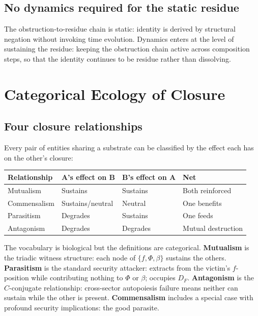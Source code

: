 \documentclass[11pt,a4paper]{article}
\theoremstyle{definition}
\theoremstyle{remark}
\begin{document}
\subsection{No dynamics required for the static residue}

The obstruction-to-residue chain is static: identity is derived by structural negation without invoking time evolution. Dynamics enters at the level of sustaining the residue: keeping the obstruction chain active across composition steps, so that the identity continues to be residue rather than dissolving.

\section{Categorical Ecology of Closure}
\label{sec:ecology}

\subsection{Four closure relationships}

Every pair of entities sharing a substrate can be classified by the effect each has on the other's closure:

\begin{table}[ht]
\centering
\begin{tabular}{llll}
\toprule
\textbf{Relationship} & \textbf{A's effect on B} & \textbf{B's effect on A} & \textbf{Net} \\
\midrule
Mutualism & Sustains & Sustains & Both reinforced \\
Commensalism & Sustains/neutral & Neutral & One benefits \\
Parasitism & Degrades & Sustains & One feeds \\
Antagonism & Degrades & Degrades & Mutual destruction \\
\bottomrule
\end{tabular}
\end{table}

The vocabulary is biological but the definitions are categorical. \textbf{Mutualism} is the triadic witness structure: each node of $\{f, \Phi, \beta\}$ sustains the others. \textbf{Parasitism} is the standard security attacker: extracts from the victim's $f$-position while contributing nothing to $\Phi$ or $\beta$; occupies $D_F$. \textbf{Antagonism} is the $C$-conjugate relationship: cross-sector autopoiesis failure means neither can sustain while the other is present. \textbf{Commensalism} includes a special case with profound security implications: the good parasite.
\end{document}
